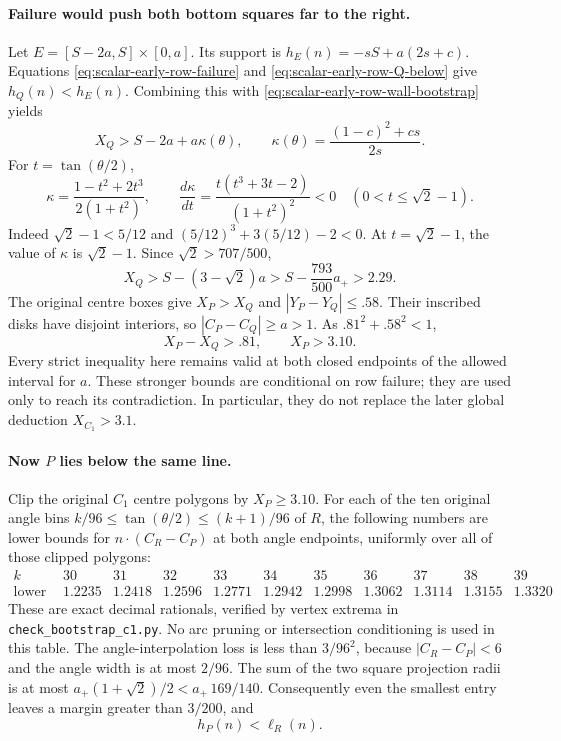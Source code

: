 \documentclass[11pt]{article}
\begin{document}
\paragraph{Failure would push both bottom squares far to the right.}
Let $E=[S-2a,S]\times[0,a]$. Its support is
$h_E(n)=-sS+a(2s+c)$. Equations \eqref{eq:scalar-early-row-failure} and
\eqref{eq:scalar-early-row-Q-below} give $h_Q(n)<h_E(n)$.
Combining this with \eqref{eq:scalar-early-row-wall-bootstrap} yields
\[
 X_Q>S-2a+a\kappa(\theta),\qquad
 \kappa(\theta)=\frac{(1-c)^2+cs}{2s}.
\]
For $t=\tan(\theta/2)$,
\[
 \kappa=\frac{1-t^2+2t^3}{2(1+t^2)},\qquad
 \frac{d\kappa}{dt}=\frac{t(t^3+3t-2)}{(1+t^2)^2}<0
 \quad(0<t\le\sqrt2-1).
\]
Indeed $\sqrt2-1<5/12$ and $(5/12)^3+3(5/12)-2<0$.
At $t=\sqrt2-1$, the value of $\kappa$ is $\sqrt2-1$.
Since $\sqrt2>707/500$,
\[
 X_Q>S-(3-\sqrt2)a>S-\frac{793}{500}a_+>2.29.
\]
The original centre boxes give $X_P>X_Q$ and
$|Y_P-Y_Q|\le.58$. Their inscribed disks have disjoint interiors,
so $|C_P-C_Q|\ge a>1$. As $.81^2+.58^2<1$,
\begin{equation}\label{eq:scalar-early-row-P-right}
 X_P-X_Q>.81,\qquad X_P>3.10.
\end{equation}
Every strict inequality here remains valid at both closed endpoints of
the allowed interval for $a$. These stronger bounds are conditional on
row failure; they are used only to reach its contradiction. In particular,
they do not replace the later global deduction $X_{C_1}>3.1$.

\paragraph{Now $P$ lies below the same line.}
Clip the original $C_1$ centre polygons by $X_P\ge3.10$. For each
of the ten original angle bins $k/96\le\tan(\theta/2)\le(k+1)/96$
of $R$, the following numbers are lower bounds for
$n\cdot(C_R-C_P)$ at both angle endpoints, uniformly over all of
those clipped polygons:
\[
\begin{array}{c|rrrrrrrrrr}
k&30&31&32&33&34&35&36&37&38&39\\\hline
\text{lower bound}&1.2235&1.2418&1.2596&1.2771&1.2942&
1.2998&1.3062&1.3114&1.3155&1.3320
\end{array}
\]
These are exact decimal rationals, verified by vertex extrema in
\texttt{check\_bootstrap\_c1.py}. No arc pruning or intersection
conditioning is used in this table. The angle-interpolation loss is
less than $3/96^2$, because $|C_R-C_P|<6$ and the angle width is
at most $2/96$. The sum of the two square projection radii is at most
$a_+(1+\sqrt2)/2<a_+\,169/140$. Consequently even the smallest
entry leaves a margin greater than $3/200$, and
\begin{equation}\label{eq:scalar-early-row-P-below}
 h_P(n)<\ell_R(n).
\end{equation}
\end{document}
